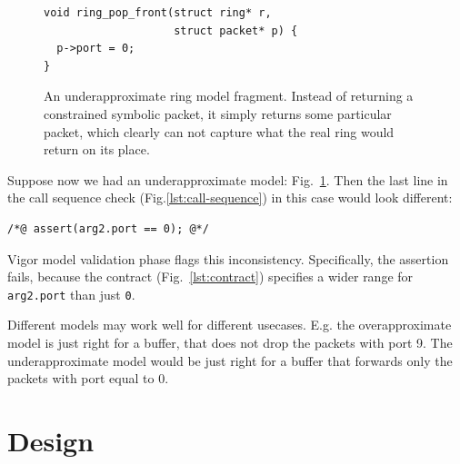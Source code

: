 \documentclass[letterpaper,twocolumn,10pt]{article}
\newcommand{\code}[1]{\lstinline{#1}}
\begin{document}
\begin{figure}[h!]
\begin{lstlisting}
void ring_pop_front(struct ring* r,
                    struct packet* p) {
  p->port = 0;
}
\end{lstlisting}
  \caption{An underapproximate ring model fragment. Instead of returning a
    constrained symbolic packet, it simply returns some particular packet, which
    clearly can not capture what the real ring would return on its place.}
  \label{lst:underapproximate}
\end{figure}

Suppose now we had an underapproximate model: Fig.~\ref{lst:underapproximate}.
Then the last line in the call sequence check (Fig.\ref{lst:call-sequence}) in
this case would look different:
\begin{lstlisting}
/*@ assert(arg2.port == 0); @*/
\end{lstlisting}
Vigor model validation phase flags this inconsistency. Specifically, the
assertion fails, because the contract (Fig.~\ref{lst:contract}) specifies a
wider range for \code{arg2.port} than just \code{0}.

Different models may work well for different usecases. E.g. the overapproximate
model is just right for a buffer, that does not drop the packets with port 9.
The underapproximate model would be just right for a buffer that forwards only the
packets with port equal to 0.




\section{Design}
\label{sec:design}
\end{document}
